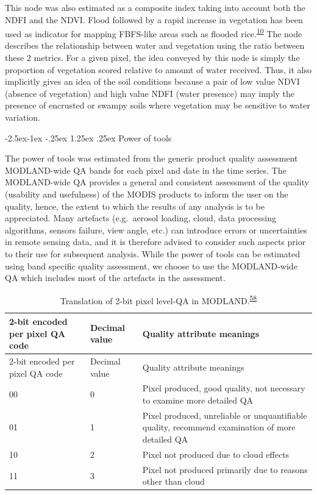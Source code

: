 \documentclass[12pt,oneside]{article}
\makeatletter
\renewcommand\paragraph{\@startsection{paragraph}{4}{\z@}%
            {-2.5ex\@plus -1ex \@minus -.25ex}%
            {1.25ex \@plus .25ex}%
            {\normalfont\normalsize\bfseries}}
\makeatother
\begin{document}
This node was also estimated as a composite index taking into account
both the NDFI and the NDVI. Flood followed by a rapid increase in
vegetation has been used as indicator for mapping FBFS-like areas such
as flooded
rice.\textsuperscript{\protect\hyperlink{ref-Boschetti_et_al_2014}{10}}
The node describes the relationship between water and vegetation using
the ratio between these 2 metrics. For a given pixel, the idea conveyed
by this node is simply the proportion of vegetation scored relative to
amount of water received. Thus, it also implicitly gives an idea of the
soil conditions because a pair of low value NDVI (absence of vegetation)
and high value NDFI (water presence) may imply the presence of encrusted
or swampy soils where vegetation may be sensitive to water variation.

\hypertarget{I.5.2.5}{%
\paragraph{Power of tools}\label{I.5.2.5}}

The power of tools was estimated from the generic product quality
assessment MODLAND-wide QA bands for each pixel and date in the time
series. The MODLAND-wide QA provides a general and consistent assessment
of the quality (usability and usefulness) of the MODIS products to
inform the user on the quality, hence, the extent to which the results
of any analysis is to be appreciated. Many artefacts (e.g.~aerosol
loading, cloud, data processing algorithms, sensors failure, view angle,
etc.) can introduce errors or uncertainties in remote sensing data, and
it is therefore advised to consider such aspects prior to their use for
subsequent analysis. While the power of tools can be estimated using
band specific quality assessment, we choose to use the MODLAND-wide QA
which includes most of the artefacts in the assessment.

\begin{longtable}[]{@{}lll@{}}
\caption{Translation of 2-bit pixel level-QA in
MODLAND.\textsuperscript{\protect\hyperlink{ref-Roy_et_al_2002}{58}}}\tabularnewline
\toprule
2-bit encoded per pixel QA code & Decimal value & Quality attribute
meanings\tabularnewline
\midrule
\endfirsthead
\toprule
2-bit encoded per pixel QA code & Decimal value & Quality attribute
meanings\tabularnewline
\midrule
\endhead
00 & 0 & Pixel produced, good quality, not necessary to examine more
detailed QA\tabularnewline
01 & 1 & Pixel produced, unreliable or unquantifiable quality, recommend
examination of more detailed QA\tabularnewline
10 & 2 & Pixel not produced due to cloud effects\tabularnewline
11 & 3 & Pixel not produced primarily due to reasons other than
cloud\tabularnewline
\bottomrule
\end{longtable}
\end{document}
